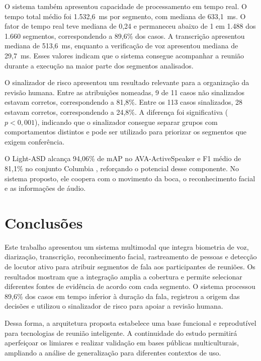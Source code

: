 \documentclass[a4paper,11pt]{article}
\begin{document}
O sistema também apresentou capacidade de processamento em tempo real. O tempo total médio foi 1.532,6~ms por segmento, com mediana de 633,1~ms. O fator de tempo real teve mediana de 0,24 e permaneceu abaixo de 1 em 1.488 dos 1.660 segmentos, correspondendo a 89,6\% dos casos. A transcrição apresentou mediana de 513,6~ms, enquanto a verificação de voz apresentou mediana de 29,7~ms. Esses valores indicam que o sistema consegue acompanhar a reunião durante a execução na maior parte dos segmentos analisados.

O sinalizador de risco apresentou um resultado relevante para a organização da revisão humana. Entre as atribuições nomeadas, 9 de 11 casos não sinalizados estavam corretos, correspondendo a 81,8\%. Entre os 113 casos sinalizados, 28 estavam corretos, correspondendo a 24,8\%. A diferença foi significativa ($p<0{,}001$), indicando que o sinalizador consegue separar grupos com comportamentos distintos e pode ser utilizado para priorizar os segmentos que exigem conferência.

O Light-ASD alcança 94,06\% de mAP no AVA-ActiveSpeaker e F1 médio de 81,1\% no conjunto Columbia \cite{liao2023,chakravarty2016}, reforçando o potencial desse componente. No sistema proposto, ele coopera com o movimento da boca, o reconhecimento facial e as informações de áudio.

\section*{Conclusões}

Este trabalho apresentou um sistema multimodal que integra biometria de voz, diarização, transcrição, reconhecimento facial, rastreamento de pessoas e detecção de locutor ativo para atribuir segmentos de fala aos participantes de reuniões. Os resultados mostram que a integração amplia a cobertura e permite selecionar diferentes fontes de evidência de acordo com cada segmento. O sistema processou 89,6\% dos casos em tempo inferior à duração da fala, registrou a origem das decisões e utilizou o sinalizador de risco para apoiar a revisão humana.

Dessa forma, a arquitetura proposta estabelece uma base funcional e reprodutível para tecnologias de reunião inteligente. A continuidade do estudo permitirá aperfeiçoar os limiares e realizar validação em bases públicas multiculturais, ampliando a análise de generalização para diferentes contextos de uso.



\end{document}
